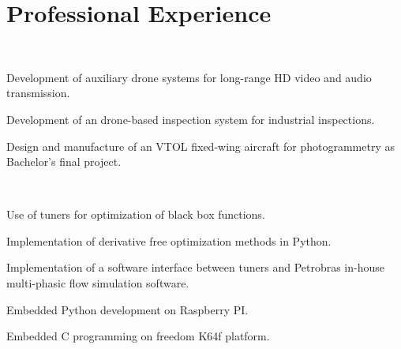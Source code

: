 \documentclass[A4]{deedy-resume} %
\begin{document}
\begin{minipage}[t]{0.66\textwidth} %



\section{Professional Experience}

\\
\vspace{\topsep}
\begin{tightitemize}
 \item Development of auxiliary drone systems for long-range HD video and audio transmission.
 \item Development of an drone-based inspection system for industrial inspections.
 \item Design and manufacture of an VTOL fixed-wing aircraft for photogrammetry as Bachelor's final project.
\end{tightitemize}
\sectionspace %

\\
\vspace{\topsep} %
\begin{tightitemize}
 \item Use of tuners for optimization of black box functions.
 \item Implementation of derivative free optimization methods in Python.
 \item Implementation of a software interface between tuners and Petrobras in-house multi-phasic flow simulation software.

\end{tightitemize}

\sectionspace %

\vspace{\topsep} %
\begin{tightitemize}
 \item Embedded Python development on Raspberry PI.
 \item Embedded C programming on freedom K64f platform.
\end{tightitemize}


\end{minipage}
\end{document}
